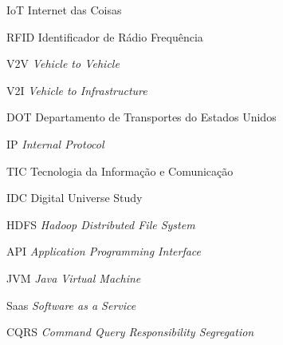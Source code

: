 \begin{siglas}
  \item[IoT] Internet das Coisas
  \item[RFID] Identificador de Rádio Frequência
  \item[V2V] \textit{Vehicle to Vehicle}
  \item[V2I] \textit{Vehicle to Infrastructure}
  \item[DOT] Departamento de Transportes do Estados Unidos
  \item[IP]  \textit{Internal Protocol}
  \item[TIC] Tecnologia da Informação e Comunicação
  \item[IDC] Digital Universe Study
  \item[HDFS] \textit{Hadoop Distributed File System}
  \item[API] \textit{Application Programming Interface}
  \item[JVM] \textit{Java Virtual Machine}
  \item[Saas] \textit{Software as a Service}
  \item[CQRS] \textit{Command Query Responsibility Segregation}
\end{siglas}